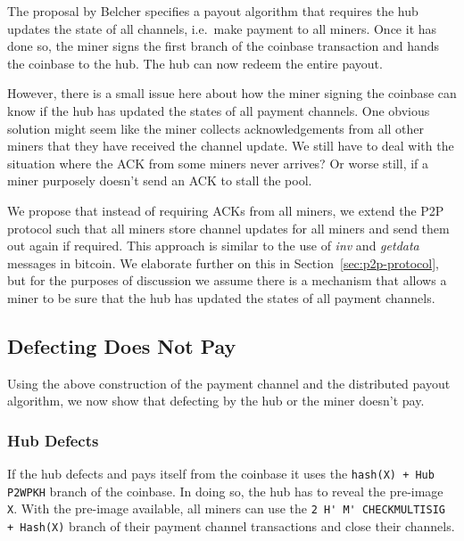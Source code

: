\documentclass{article}
\begin{document}
The proposal by Belcher specifies a payout algorithm that requires the
hub updates the state of all channels, i.e.\ make payment to all
miners. Once it has done so, the miner signs the first branch of the
coinbase transaction and hands the coinbase to the hub. The hub can now
redeem the entire payout.

However, there is a small issue here about how the miner signing the
coinbase can know if the hub has updated the states of all payment
channels. One obvious solution might seem like the miner collects
acknowledgements from all other miners that they have received the
channel update. We still have to deal with the situation where the ACK
from some miners never arrives? Or worse still, if a miner purposely
doesn't send an ACK to stall the pool.

We propose that instead of requiring ACKs from all miners, we extend
the P2P protocol such that all miners store channel updates for all
miners and send them out again if required. This approach is similar
to the use of \emph{inv} and \emph{getdata} messages in bitcoin. We
elaborate further on this in Section~\ref{sec:p2p-protocol}, but for
the purposes of discussion we assume there is a mechanism that allows
a miner to be sure that the hub has updated the states of all payment
channels.




\subsection{Defecting Does Not Pay}\label{ref:defecting}

Using the above construction of the payment channel and the
distributed payout algorithm, we now show that defecting by the hub or
the miner doesn't pay.

\subsubsection{Hub Defects}\label{ref:hub-defects}

If the hub defects and pays itself from the coinbase it uses the
\verb|hash(X) + Hub P2WPKH| branch of the coinbase. In doing so, the
hub has to reveal the pre-image \verb|X|. With the pre-image
available, all miners can use the
\verb|2 H' M' CHECKMULTISIG + Hash(X)| branch of their payment channel
transactions and close their channels.
\end{document}
